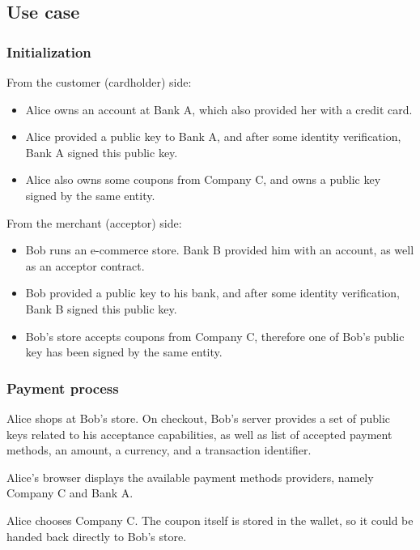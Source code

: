 \subsection{Use case}\label{use-case}

\subsubsection{Initialization}\label{initialization}

From the customer (cardholder) side:

\begin{itemize}
\item
  Alice owns an account at Bank A, which also provided her with a credit
  card.
\item
  Alice provided a public key to Bank A, and after some identity
  verification, Bank A signed this public key.
\item
  Alice also owns some coupons from Company C, and owns a public key
  signed by the same entity.
\end{itemize}

From the merchant (acceptor) side:

\begin{itemize}
\item
  Bob runs an e-commerce store. Bank B provided him with an account, as
  well as an acceptor contract.
\item
  Bob provided a public key to his bank, and after some identity
  verification, Bank B signed this public key.
\item
  Bob's store accepts coupons from Company C, therefore one of Bob's
  public key has been signed by the same entity.
\end{itemize}

\subsubsection{Payment process}\label{payment-process}

Alice shops at Bob's store. On checkout, Bob's server provides a set of
public keys related to his acceptance capabilities, as well as list of
accepted payment methods, an amount, a currency, and a transaction
identifier.

Alice's browser displays the available payment methods providers, namely
Company C and Bank A.

Alice chooses Company C. The coupon itself is stored in the wallet, so
it could be handed back directly to Bob's store.


